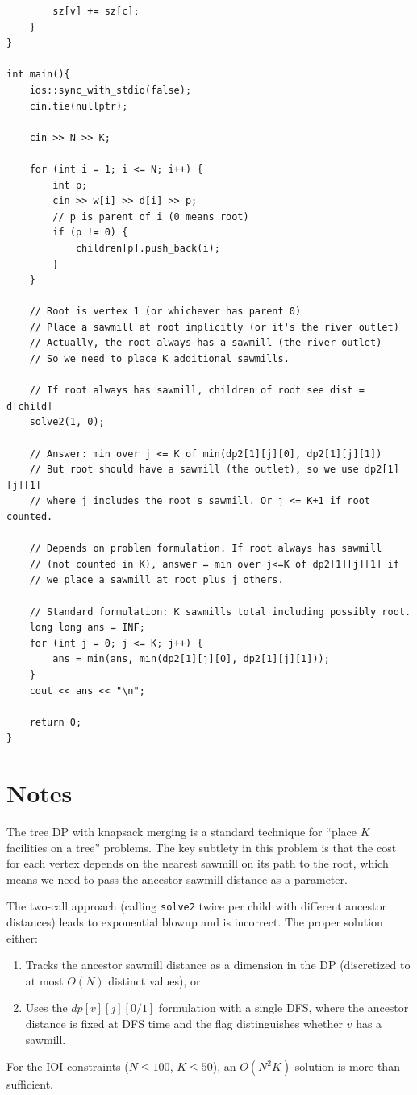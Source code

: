 \documentclass[11pt,a4paper]{article}
\begin{document}
\begin{lstlisting}
        sz[v] += sz[c];
    }
}

int main(){
    ios::sync_with_stdio(false);
    cin.tie(nullptr);

    cin >> N >> K;

    for (int i = 1; i <= N; i++) {
        int p;
        cin >> w[i] >> d[i] >> p;
        // p is parent of i (0 means root)
        if (p != 0) {
            children[p].push_back(i);
        }
    }

    // Root is vertex 1 (or whichever has parent 0)
    // Place a sawmill at root implicitly (or it's the river outlet)
    // Actually, the root always has a sawmill (the river outlet)
    // So we need to place K additional sawmills.

    // If root always has sawmill, children of root see dist = d[child]
    solve2(1, 0);

    // Answer: min over j <= K of min(dp2[1][j][0], dp2[1][j][1])
    // But root should have a sawmill (the outlet), so we use dp2[1][j][1]
    // where j includes the root's sawmill. Or j <= K+1 if root counted.

    // Depends on problem formulation. If root always has sawmill
    // (not counted in K), answer = min over j<=K of dp2[1][j][1] if
    // we place a sawmill at root plus j others.

    // Standard formulation: K sawmills total including possibly root.
    long long ans = INF;
    for (int j = 0; j <= K; j++) {
        ans = min(ans, min(dp2[1][j][0], dp2[1][j][1]));
    }
    cout << ans << "\n";

    return 0;
}
\end{lstlisting}

\section{Notes}
The tree DP with knapsack merging is a standard technique for ``place $K$ facilities on a tree'' problems. The key subtlety in this problem is that the cost for each vertex depends on the nearest sawmill on its path to the root, which means we need to pass the ancestor-sawmill distance as a parameter.

The two-call approach (calling \texttt{solve2} twice per child with different ancestor distances) leads to exponential blowup and is incorrect. The proper solution either:
\begin{enumerate}
    \item Tracks the ancestor sawmill distance as a dimension in the DP (discretized to at most $O(N)$ distinct values), or
    \item Uses the $dp[v][j][0/1]$ formulation with a single DFS, where the ancestor distance is fixed at DFS time and the flag distinguishes whether $v$ has a sawmill.
\end{enumerate}

For the IOI constraints ($N \leq 100$, $K \leq 50$), an $O(N^2 K)$ solution is more than sufficient.
\end{document}
